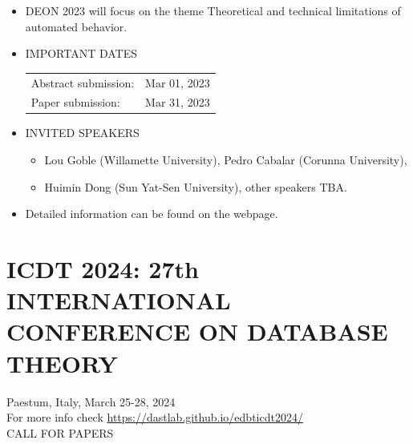 \documentclass[prodmode,acmtecs]{acmsmall} %
\begin{document}
\begin{itemize}\item  DEON 2023 will focus on the theme Theoretical and technical limitations of automated behavior. 
 
\item  IMPORTANT DATES 
 
\begin{tabulary}{\linewidth}{LL}Abstract submission:  & Mar 01, 2023 \\
Paper submission:  & Mar 31, 2023 \\
\end{tabulary}
 
\item  INVITED SPEAKERS 
 
\begin{itemize}\item Lou Goble (Willamette University), Pedro Cabalar (Corunna University),
\item  Huimin Dong (Sun Yat-Sen University), other speakers TBA.
\end{itemize} 
\item  Detailed information can be found on the webpage. 
 
\end{itemize}\section{ICDT 2024: 27th INTERNATIONAL CONFERENCE ON DATABASE THEORY}\label{ICDT2024}  Paestum, Italy, March 25-28, 2024\\ 
  For more info check \href{https://dastlab.github.io/edbticdt2024/}{https://dastlab.github.io/edbticdt2024/}\\ 
CALL FOR PAPERS 
\end{document}
